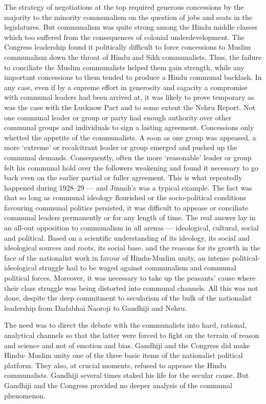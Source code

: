 \begin{multicols}{2}
The strategy of negotiations at the top required generous concessions by the majority to the minority communalism on the question of jobs and seats in the legislatures. But communalism was quite strong among the Hindu middle classes which too suffered from the consequences of colonial underdevelopment. The Congress leadership found it politically difficult to force concessions to Muslim communalism down the throat of Hindu and Sikh communalists. Thus, the failure to conciliate the Muslim communalists helped them gain strength, while any important concessions to them tended to produce a Hindu communal backlash. In any case, even if by a supreme effort in generosity and sagacity a compromise with communal leaders had been arrived at, it was likely to prove temporary as was the case with the Lucknow Pact and to some extent the Nehru Report. Not one communal leader or group or party had enough authority over other communal groups and individuals to sign a lasting agreement. Concessions only whetted the appetite of the communalists. A soon as one group was appeased, a more `extreme' or recalcitrant leader or group emerged and pushed up the communal demands. Consequently, often the more `reasonable' leader or group felt his communal hold over the followers weakening and found it necessary to go back even on the earlier partial or fuller agreement. This is what repeatedly happened during 1928--29 --- and Jinnah's was a typical example. The fact was that so long as communal ideology flourished or the socio-political conditions favouring communal politics persisted, it was difficult to appease or conciliate communal leaders permanently or for any length of time. The real answer lay in an all-out opposition to communalism in all arenas --- ideological, cultural, social and political. Based on a scientific understanding of its ideology, its social and ideological sources and roots, its social base, and the reasons for its growth in the face of the nationalist work in favour of Hindu-Muslim unity, an intense political-ideological struggle had to be waged against communalism and communal political forces. Moreover, it was necessary to take up the peasants' cause where their class struggle was being distorted into communal channels. All this was not done, despite the deep commitment to secularism of the bulk of the nationalist leadership from Dadabhai Naoroji to Gandhiji and Nehru. 

The need was to direct the debate with the communalists into hard, rational, analytical channels so that the latter were forced to fight on the terrain of reason and science and not of emotion and bias. Gandhiji and the Congress did make Hindu- Muslim unity one of the three basic items of the nationalist political platform. They also, at crucial moments, refused to appease the Hindu communalists. Gandhiji several times staked his life for the secular cause. But Gandhiji and the Congress provided no deeper analysis of the communal phenomenon. 


\end{multicols}
